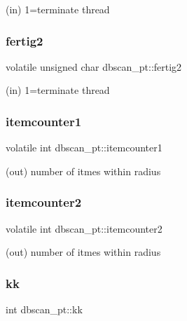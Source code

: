 (in) 1=terminate thread 

\mbox{\label{structdbscan__pt_a6e02721843281f1f83499d2e7c3ffd32}} 
\subsubsection{\texorpdfstring{fertig2}{fertig2}}
{\footnotesize\ttfamily volatile unsigned char dbscan\+\_\+pt\+::fertig2}



(in) 1=terminate thread 

\mbox{\label{structdbscan__pt_af71b0c6290be59f918f5fded65ca5aa0}} 
\subsubsection{\texorpdfstring{itemcounter1}{itemcounter1}}
{\footnotesize\ttfamily volatile int dbscan\+\_\+pt\+::itemcounter1}



(out) number of itmes within radius 

\mbox{\label{structdbscan__pt_a7282c5e97e591646a31c5762bf39bd3f}} 
\subsubsection{\texorpdfstring{itemcounter2}{itemcounter2}}
{\footnotesize\ttfamily volatile int dbscan\+\_\+pt\+::itemcounter2}



(out) number of itmes within radius 

\mbox{\label{structdbscan__pt_a07b73afdc253e16524b7eae0f6ec26b4}} 
\subsubsection{\texorpdfstring{kk}{kk}}
{\footnotesize\ttfamily int dbscan\+\_\+pt\+::kk}



